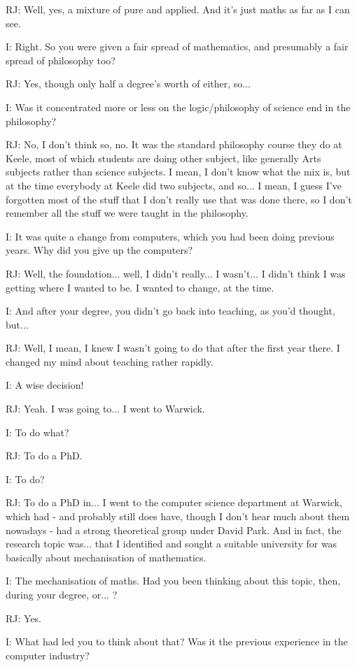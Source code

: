 \documentclass[10pt,titlepage]{book}
\begin{document}
RJ: Well, yes, a mixture of pure and applied. And it's just maths as far as I can see.

I: Right. So you were given a fair spread of mathematics, and presumably a fair spread of philosophy too?

RJ: Yes, though only half a degree's	worth of either, so...

I: Was it concentrated more or less on the logic/philosophy of science end in the philosophy?

RJ: No, I don't think so, no. It was the standard philosophy course they do at Keele, most of which students are doing other subject, like generally Arts subjects rather than science subjects. I mean, I don't know what the mix is, but at the time everybody at Keele did two subjects, and so... I mean, I guess I've forgotten most of the stuff that I don't really use that was done there, so I don't remember all the stuff we were taught in the philosophy.

I: It was quite a change from computers, which you had been doing previous years. Why did you give up the computers?

RJ: Well, the foundation... well, I didn't really... I wasn't... I didn't think I was getting where I wanted to be. I wanted to change, at the time.

I: And after your degree, you didn't go back into teaching, as you'd thought, but...

RJ: Well, I mean, I knew I wasn't going to do that after the first year there. I changed my mind about teaching rather rapidly.

I: A wise decision!

RJ: Yeah. I was going to... I went to Warwick.

I: To do what?

RJ: To do a PhD.

I: To do?

RJ: To do a PhD in... I went to the computer science department at Warwick, which had - and probably still does have, though I don't hear much about them nowadays - had a strong theoretical group under David Park. And in fact, the research topic was... that I identified and sought a suitable university for was basically about mechanisation of mathematics.

I: The mechanisation of maths. Had you been thinking about this topic, then, during your degree, or... ?

RJ: Yes.

I: What had led you to think about that? Was it the previous experience in the computer industry?
\end{document}
